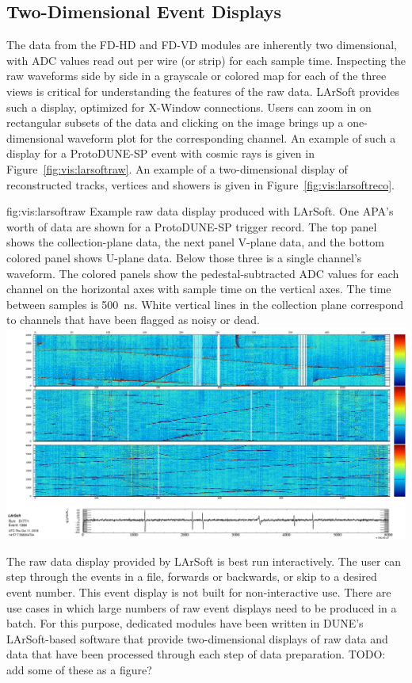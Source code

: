 \documentclass[../main-v1.tex]{subfiles}
\begin{document}
\subsection{Two-Dimensional Event Displays}
\label{sec:visualization:2d}

The data from the FD-HD and FD-VD modules are inherently two dimensional, with ADC values read out per wire (or strip) for each sample time.  Inspecting the raw waveforms side by side in a grayscale or colored map for each of the three views is critical for understanding the features of the raw data.  LArSoft provides such a display, optimized for X-Window connections.  Users can zoom in on rectangular subsets of the data and clicking on the image brings up a one-dimensional waveform plot for the corresponding channel.  An example of such a display for a ProtoDUNE-SP event with cosmic rays is given in Figure~\ref{fig:vis:larsoftraw}.  An example of a two-dimensional display of reconstructed tracks, vertices and showers is given in Figure~\ref{fig:vis:larsoftreco}.  

\begin{dunefigure}
{fig:vis:larsoftraw} 
{Example raw data display produced with LArSoft.  One APA's worth of data are shown for a ProtoDUNE-SP trigger record. The top panel shows the collection-plane data, the next panel V-plane data, and the bottom colored panel shows U-plane data.  Below those three is a single channel's waveform.  The colored panels show the pedestal-subtracted ADC values for each channel on the horizontal axes with sample time on the vertical axes.  The time between samples is 500~ns.  White vertical lines in the collection plane correspond to channels that have been flagged as noisy or dead.}
\includegraphics[width=0.9 \textwidth]{graphics/EventDisplays/pdsp_larsoft_rawevent.png}
\end{dunefigure}

The raw data display provided by LArSoft is best run interactively.  The user can step through the events in a file, forwards or backwards, or skip to a desired event number.  This event display is not built for non-interactive use.  There are use cases in which large numbers of raw event displays need to be produced in a batch.  For this purpose, dedicated modules have been written in DUNE's LArSoft-based software that provide two-dimensional displays of raw data and data that have been processed through each step of data preparation.  {\color{red} TODO:  add some of these as a figure?}
\end{document}
